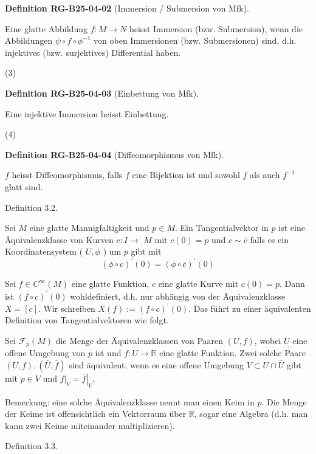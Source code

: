 \documentclass[10pt, letterpaper]{article}
\newcommand{\CustomHeading}[3]{%
  \par\medskip\noindent%
  \textbf{#1 #2} \textnormal{(#3)}.\enskip%
}
\newenvironment{DEF}[2]{\begin{unitbox}\CustomHeading{Definition}{#1}{#2}}{\end{unitbox}}
\begin{document}
\begin{DEF}{RG-B25-04-02}{Immersion / Submersion von Mfk}
Eine glatte Abbildung $f: M \rightarrow N$ heisst Immersion (bzw. Submersion), wenn die Abbildungen $\psi \circ f \circ \phi^{-1}$ von oben Immersionen (bzw. Submersionen) sind, d.h. injektives (bzw. surjektives) Differential haben.
\end{DEF}

(3) 

\begin{DEF}{RG-B25-04-03}{Einbettung von Mfk}
Eine injektive Immersion heisst Einbettung.
\end{DEF}


(4) 

\begin{DEF}{RG-B25-04-04}{Diffeomorphismus von Mfk}
$f$ heisst Diffeomorphismus, falls $f$ eine Bijektion ist und sowohl $f$ als auch $f^{-1}$ glatt sind.
\end{DEF}


Definition 3.2. 



Sei $M$ eine glatte Mannigfaltigkeit und $p \in M$. Ein Tangentialvektor in $p$ ist eine Äquivalenzklasse von Kurven $c: I \rightarrow$ $M$ mit $c(0)=p$ und $c \sim \bar{c}$ falls es ein Koordinatensystem ( $U, \phi$ ) um $p$ gibt mit
$$
(\phi \circ c)^{\prime}(0)=(\phi \circ \bar{c})^{\prime}(0)
$$


Sei $f \in C^{\infty}(M)$ eine glatte Funktion, $c$ eine glatte Kurve mit $c(0)=p$. Dann ist $(f \circ c)^{\prime}(0)$ wohldefiniert, d.h. nur abhängig von der Äquivalenzklasse $X=[c]$. Wir schreiben $X(f):=(f \circ c)^{\prime}(0)$. Das führt zu einer äquivalenten Definition von Tangentialvektoren wie folgt.



Sei $\mathcal{F}_{p}(M)$ die Menge der Äquivalenzklassen von Paaren $(U, f)$, wobei $U$ eine offene Umgebung von $p$ ist und $f: U \rightarrow \mathbb{R}$ eine glatte Funktion. Zwei solche Paare $(U, f),(\bar{U}, \bar{f})$ sind äquivalent, wenn es eine offene Umgebung $V \subset U \cap \bar{U}$ gibt mit $p \in V$ und $\left.f\right|_{V}=\left.\bar{f}\right|_{V}$.

Bemerkung: eine solche Äquivalenzklasse nennt man einen Keim in $p$. Die Menge der Keime ist offensichtlich ein Vektorraum über $\mathbb{R}$, sogar eine Algebra (d.h. man kann zwei Keime miteinander multiplizieren).



Definition 3.3. 
\end{document}
